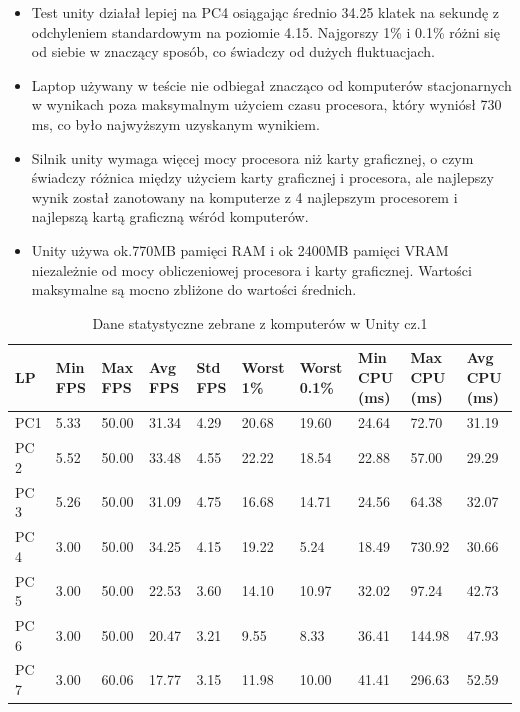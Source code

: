\documentclass[12pt,twoside]{article}
\begin{document}
\begin{itemize}
\item Test unity działał lepiej na PC4 osiągając średnio 34.25 klatek na sekundę
z odchyleniem standardowym  na poziomie 4.15. Najgorszy 1\% i 0.1\% różni się od
siebie w znaczący sposób, co świadczy od dużych fluktuacjach. 

\item Laptop używany w teście nie odbiegał znacząco od komputerów stacjonarnych
w wynikach poza maksymalnym użyciem czasu procesora, który wyniósł 730 ms, co
było najwyższym uzyskanym wynikiem. 

\item Silnik unity wymaga więcej mocy procesora niż karty graficznej, o czym
świadczy różnica między użyciem karty graficznej i procesora, ale najlepszy
wynik został zanotowany na komputerze z 4 najlepszym procesorem i najlepszą
kartą graficzną wśród komputerów. 

\item Unity używa ok.770MB pamięci RAM i ok 2400MB pamięci VRAM niezależnie od
mocy obliczeniowej procesora i karty graficznej. Wartości maksymalne są mocno
zbliżone do wartości średnich. 
\end{itemize}

\begin{table}[h]
    \caption{Dane statystyczne zebrane z komputerów w Unity cz.1}
    \centering		
        \begin{tabular}{|p{1cm}|p{1cm}|p{1cm}|p{1cm}|p{1cm}|p{1cm}|p{1cm}|p{1cm}|p{}|p{1cm}|}	
            \hline
            LP & Min FPS & Max FPS & Avg FPS & Std FPS & Worst 1\% & Worst 0.1\% & Min CPU (ms) & Max CPU (ms)  & Avg CPU (ms) \\
            \hline
            PC1 & 5.33 & 50.00 & 31.34 & 4.29 & 20.68 & 19.60 & 24.64 & 72.70 & 31.19 \\
            \hline
            PC 2 & 5.52 & 50.00 & 33.48 & 4.55 & 22.22 & 18.54 & 22.88 & 57.00 & 29.29 \\
            \hline
            PC 3 & 5.26 & 50.00 & 31.09 & 4.75 & 16.68 & 14.71 & 24.56 & 64.38 & 32.07 \\
            \hline
            PC 4 & 3.00 & 50.00 & 34.25 & 4.15 & 19.22 & 5.24 & 18.49 & 730.92 & 30.66 \\
            \hline
            PC 5 & 3.00 & 50.00 & 22.53 & 3.60 & 14.10 & 10.97 & 32.02 & 97.24 & 42.73 \\
            \hline
            PC 6 & 3.00 & 50.00 & 20.47 & 3.21 & 9.55 & 8.33 & 36.41 & 144.98 & 47.93 \\
            \hline
            PC 7 & 3.00 & 60.06 & 17.77 & 3.15 & 11.98 & 10.00 & 41.41 & 296.63 & 52.59 \\
            \hline
        \end{tabular}	
    \label{Tabela:StatystykiUnity1}
\end{table}	
\end{document}
